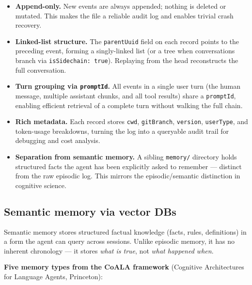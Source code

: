 \begin{itemize}
  \item \textbf{Append-only.} New events are always appended; nothing is deleted or
    mutated. This makes the file a reliable audit log and enables trivial crash recovery.

  \item \textbf{Linked-list structure.} The \texttt{parentUuid} field on each record
    points to the preceding event, forming a singly-linked list (or a tree when
    conversations branch via \texttt{isSidechain: true}). Replaying from the head
    reconstructs the full conversation.

  \item \textbf{Turn grouping via \texttt{promptId}.} All events in a single user turn
    (the human message, multiple assistant chunks, and all tool results) share a
    \texttt{promptId}, enabling efficient retrieval of a complete turn without walking
    the full chain.

  \item \textbf{Rich metadata.} Each record stores \texttt{cwd}, \texttt{gitBranch},
    \texttt{version}, \texttt{userType}, and token-usage breakdowns, turning the log
    into a queryable audit trail for debugging and cost analysis.

  \item \textbf{Separation from semantic memory.} A sibling \texttt{memory/} directory
    holds structured facts the agent has been explicitly asked to remember --- distinct
    from the raw episodic log. This mirrors the episodic/semantic distinction in
    cognitive science.
\end{itemize}

\subsection{Semantic memory via vector DBs}

Semantic memory stores structured factual knowledge (facts, rules, definitions) in a
form the agent can query across sessions. Unlike episodic memory, it has no inherent
chronology — it stores \emph{what is true}, not \emph{what happened when}.

\textbf{Five memory types from the CoALA framework} (Cognitive Architectures for
Language Agents, Princeton):

